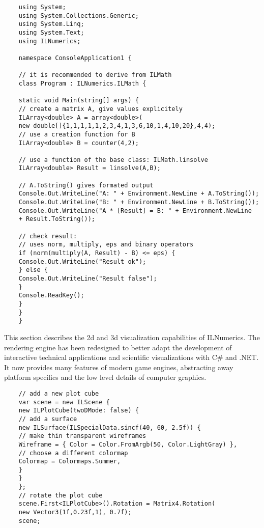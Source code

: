 	\begin{lstlisting}
	using System;
	using System.Collections.Generic;
	using System.Linq;
	using System.Text;
	using ILNumerics; 
	
	namespace ConsoleApplication1 {
	
	// it is recommended to derive from ILMath
	class Program : ILNumerics.ILMath {
	
	static void Main(string[] args) {
	// create a matrix A, give values explicitely
	ILArray<double> A = array<double>(
	new double[]{1,1,1,1,1,2,3,4,1,3,6,10,1,4,10,20},4,4);
	// use a creation function for B
	ILArray<double> B = counter(4,2); 
	
	// use a function of the base class: ILMath.linsolve 
	ILArray<double> Result = linsolve(A,B);
	
	// A.ToString() gives formated output
	Console.Out.WriteLine("A: " + Environment.NewLine + A.ToString());
	Console.Out.WriteLine("B: " + Environment.NewLine + B.ToString());
	Console.Out.WriteLine("A * [Result] = B: " + Environment.NewLine 
	+ Result.ToString()); 
	
	// check result:
	// uses norm, multiply, eps and binary operators 
	if (norm(multiply(A, Result) - B) <= eps) {
	Console.Out.WriteLine("Result ok");
	} else {
	Console.Out.WriteLine("Result false");
	}
	Console.ReadKey(); 
	}
	}
	} 
	\end{lstlisting}
	
	
	This section describes the 2d and 3d visualization capabilities of ILNumerics. The rendering engine has been redesigned to better adapt the development of interactive technical applications and scientific visualizations with C\# and .NET. It now provides many features of modern game engines, abstracting away platform specifics and the low level details of computer graphics.
	
	\begin{lstlisting}
	// add a new plot cube 
	var scene = new ILScene {
	new ILPlotCube(twoDMode: false) {
	// add a surface
	new ILSurface(ILSpecialData.sincf(40, 60, 2.5f)) {
	// make thin transparent wireframes
	Wireframe = { Color = Color.FromArgb(50, Color.LightGray) },
	// choose a different colormap
	Colormap = Colormaps.Summer, 
	}
	}
	};
	// rotate the plot cube 
	scene.First<ILPlotCube>().Rotation = Matrix4.Rotation(
	new Vector3(1f,0.23f,1), 0.7f);
	scene; 
	\end{lstlisting}
	
	
	
